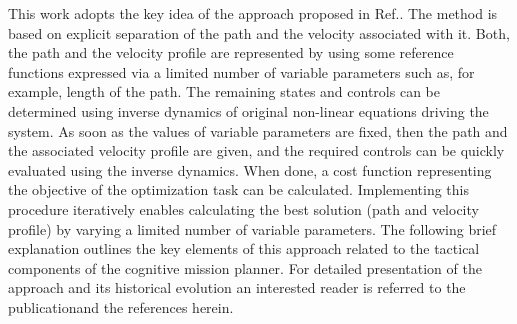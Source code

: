 \documentclass[]{aiaa-tc}%
\begin{document}
This work adopts the key idea of the approach proposed in Ref.\cite{JGCD00_Yakimenko}.
The method is based on explicit separation of the path and the velocity associated with
it. Both, the path and the velocity profile are represented by using some reference
functions expressed via a limited number of variable parameters such as, for example,
length of the path. The remaining states and controls can be determined using inverse
dynamics of original non-linear equations driving the system. As soon as the values of
variable parameters are fixed, then the path and the associated velocity profile are
given, and the required controls can be quickly evaluated using the inverse dynamics.
When done, a cost function representing the objective of the optimization task can be
calculated. Implementing this procedure iteratively enables calculating the best
solution (path and velocity profile) by varying a limited number of variable
parameters. The following brief explanation outlines the key elements of this approach
related to the tactical components of the cognitive mission planner. For detailed
presentation of the approach and its historical evolution an interested reader is
referred to the publication\cite{JGCD00_Yakimenko}and the references herein.
\end{document}
